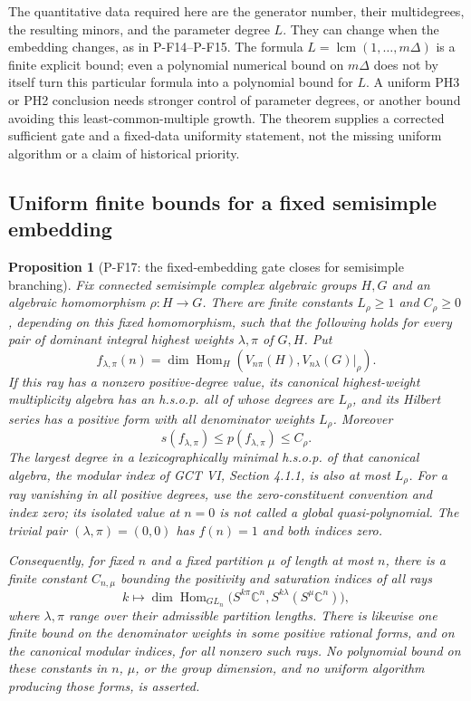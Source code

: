 \documentclass[11pt,a4paper]{article}
\newtheorem{proposition}{Proposition}[section]
\begin{document}
The quantitative data required here are the generator number, their
multidegrees, the resulting minors, and the parameter degree $L$.
They can change when the embedding changes, as in P-F14--P-F15.
The formula $L=\operatorname{lcm}(1,\ldots,m\Delta)$ is a finite
explicit bound; even a polynomial numerical bound on $m\Delta$
does not by itself turn this particular formula into a polynomial
bound for $L$. A uniform PH3 or PH2 conclusion needs stronger control
of parameter degrees, or another bound avoiding this least-common-multiple
growth. The theorem supplies a corrected sufficient gate and a fixed-data
uniformity statement, not the missing uniform algorithm or a claim of
historical priority.


\subsection{Uniform finite bounds for a fixed semisimple embedding}

\begin{proposition}[P-F17: the fixed-embedding gate closes for semisimple branching]
\label{prop:fixedplethysm}
Fix connected semisimple complex algebraic groups $H,G$ and an algebraic
homomorphism $\rho:H\to G$. There are finite constants $L_\rho\ge1$
and $C_\rho\ge0$, depending on this fixed homomorphism, such that the
following holds for every pair of dominant integral highest weights
$\lambda,\pi$ of $G,H$. Put
\[
 f_{\lambda,\pi}(n)
 =\dim\operatorname{Hom}_H
       (V_{n\pi}(H),V_{n\lambda}(G)|_\rho).
\]
If this ray has a nonzero positive-degree value, its canonical
highest-weight multiplicity algebra has an h.s.o.p. all of whose
degrees are $L_\rho$, and its Hilbert series has a positive form with
all denominator weights $L_\rho$. Moreover
\[
 s(f_{\lambda,\pi})\le p(f_{\lambda,\pi})\le C_\rho.
 \tag{P-F17a}
\]
The largest degree in a lexicographically minimal h.s.o.p. of that
canonical algebra, the modular index of GCT VI, Section 4.1.1,
is also at most $L_\rho$.
For a ray vanishing in all positive degrees, use the zero-constituent
convention and index zero; its isolated value at $n=0$ is not called
a global quasi-polynomial. The trivial pair $(\lambda,\pi)=(0,0)$
has $f(n)=1$ and both indices zero.

Consequently, for fixed $n$ and a fixed partition $\mu$ of length at
most $n$, there is a finite constant $C_{n,\mu}$ bounding the positivity
and saturation indices of all rays
\[
 k\longmapsto
 \dim\operatorname{Hom}_{GL_n}
 \bigl(S^{k\pi}\mathbb C^n,
       S^{k\lambda}(S^\mu\mathbb C^n)\bigr),
 \tag{P-F17b}
\]
where $\lambda,\pi$ range over their admissible partition lengths.
There is likewise one finite bound on the denominator weights in
some positive rational forms, and on the canonical modular indices,
for all nonzero such rays. No polynomial
bound on these constants in $n$, $\mu$, or the group dimension, and
no uniform algorithm producing those forms, is asserted.
\end{proposition}
\end{document}
